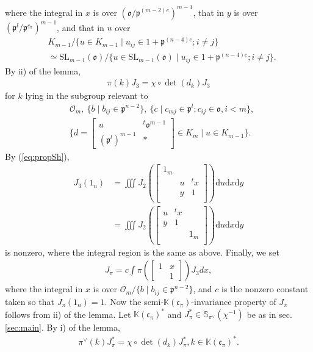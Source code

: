\documentclass[11pt]{amsart}
\newcommand\oo{\mathfrak{o}}
\newcommand\p{{\mathfrak{p}}}
\newcommand\cf{{\mathfrak{c}}}
\newcommand\dr{\mathrm{d}}
\newcommand\K{{\mathbb{K}}}
\newcommand\Sb{{\mathbb{S}}}
\newcommand\Oc{{\mathcal{O}}}
\newcommand\1{\mathbf{1}}
\newcommand\SL{{\mathrm{SL}}}
\numberwithin{equation}{section}
\begin{document}
where the integral in $x$ is over $(\oo/\p^{(m-2)e})^{m-1}$, that in $y$ is over $(\p^l/\p^{c_\pi})^{m-1}$, and that in $u$ over 
\begin{align*}
& K_{m-1}/\{u \in K_{m-1} \mid u_{ij} \in 1 + \p^{(n-4)e}; i \neq j \} \\
& \simeq 
\SL_{m-1}(\oo)/\{u \in \SL_{m-1}(\oo) \mid u_{ij} \in 1 + \p^{(n-4)e}; i \neq j \}.
\end{align*} 
By ii) of the lemma, 
\begin{align*}
\pi(k)J_3 = \chi \circ \det(d_k) J_3
\end{align*}  
for $k$ lying in the subgroup relevant to 
\begin{align*}
& \Oc_m, \ \{b \mid b_{ij} \in \p^{n-2} \}, \ \{c \mid c_{mj} \in \p^l;  c_{ij} \in \oo,  i <m \}, \\
& \{d = \begin{bmatrix}
u & {}^t \oo^{m-1} \\
(\p^l)^{m-1} & *
\end{bmatrix} \in K_m \mid u \in K_{m-1}\}.
\end{align*} 
By (\ref{eq:propSh}), 
\begin{align*}
J_3(1_n) 
&= \iiint J_2(\begin{bmatrix}
1_m & & \\
 & u & {}^t x \\
 & y &1  \\
\end{bmatrix}) \dr u \dr x \dr y \\ 
&= \iiint J_2(\begin{bmatrix}
u &{}^tx & \\
y & 1 &  \\
 &  &1_m  \\
\end{bmatrix}) \dr u \dr x \dr y 
\end{align*} 
is nonzero, where the integral region is the same as above.
Finally, we set 
\begin{align*}
J_\pi = c \int \pi(\begin{bmatrix}
1&x  \\
&1
\end{bmatrix})J_3 dx, 
\end{align*} 
where the integral in $x$ is over $\Oc_m/ \{b \mid b_{ij} \in \p^{n-2} \}$, and $c$ is the nonzero constant taken so that $J_\pi(1_n) = 1$.
Now the semi-$\K(\cf_\pi)$-invariance property of $J_\pi$ follows from ii) of the lemma.
Let $\K(\cf_\pi)^*$ and $J_\pi^* \in \Sb_{\pi^\vee}(\chi^{-1})$ be as in sec. \ref{sec:main}.
By i) of the lemma, 
\begin{align*}
\pi^\vee(k)J_\pi^* = \chi \circ \det(d_k) J_\pi^*, k \in \K(\cf_\pi)^*.
\end{align*} 
\end{document}
